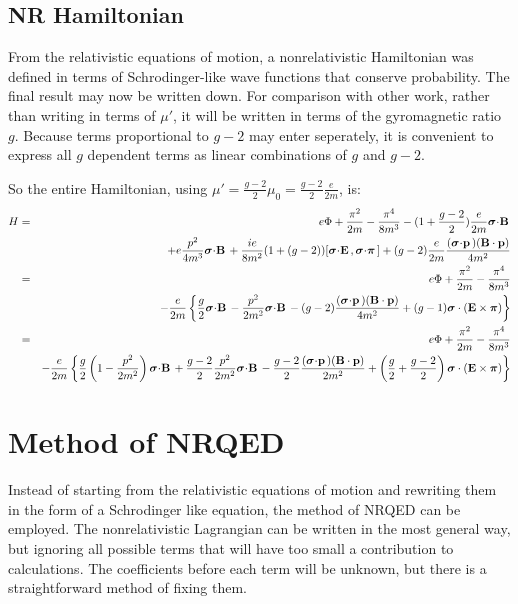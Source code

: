 \subsection*{NR Hamiltonian}
From the relativistic equations of motion, a nonrelativistic Hamiltonian was defined in terms of Schrodinger-like wave functions that conserve probability.  The final result may now be written down.  For comparison with other work, rather than writing in terms of $\mu'$, it will be written in terms of the gyromagnetic ratio $g$.  Because terms proportional to $g-2$ may enter seperately, it is convenient to express all $g$ dependent terms as linear combinations of $g$ and $g-2$. 

So the entire Hamiltonian, using $\mu' = \frac{g-2}{2}\mu_0 = \frac{g-2}{2}\frac{e}{2m} $, is:
\begin{eqnarray*}
H	&=&
		e\Phi  + \frac{ \pi^2}{2m} -\frac{\pi^4}{8m^3} - (1 + \frac{g-2}{2})\frac{e}{2m} \sigdot{B}	\\
	&&
		 + e \frac{p^2}{4m^3}\sigdot{B} + \frac{ie}{8m^2}(1 + (g-2))[\sigdot{E},\sigdotg{\pi}]
		 + (g-2) \frac{e}{2m}  \frac{ (\sigdot{p}) (\v{B} \cdot \v{p}) }{4m^2}  	\\
	&=&
		e\Phi  + \frac{ \pi^2}{2m} -\frac{\pi^4}{8m^3} 
	\\&&
		- \frac{e}{2m} \left\{
			\frac{g}{2}\sigdot{B} - \frac{p^2}{2m^2}\sigdot{B}
			- (g-2) \frac{ (\sigdot{p}) (\v{B} \cdot \v{p}) }{4m^2} 
			+(g-1) \gv{\sigma} \cdot (\v{E} \times \gv{\pi})
		\right \}	\\
	&=&
		e\Phi  + \frac{ \pi^2}{2m} -\frac{\pi^4}{8m^3} 
	\\&&
		- \frac{e}{2m} \left\{
			\frac{g}{2} \left( 1 - \frac{p^2}{2m^2} \right) \sigdot{B} + \frac{g-2}{2} \frac{p^2}{2m^2}\sigdot{B}
			- \frac{g-2}{2} \frac{ (\sigdot{p}) (\v	{B} \cdot \v{p}) }{2m^2} 
			+\left(\frac{g}{2} + \frac{g-2}{2}\right) \gv{\sigma} \cdot (\v{E} \times \gv{\pi})
		\right \}	\\	
\end{eqnarray*}

			


 
 
 

\section{Method of NRQED}
Instead of starting from the relativistic equations of motion and rewriting them in the form of a Schrodinger like equation, the method of NRQED can be employed.  The nonrelativistic Lagrangian can be written in the most general way, but ignoring all possible terms that will have too small a contribution to calculations.  The coefficients before each term will be unknown, but there is a straightforward method of fixing them.

